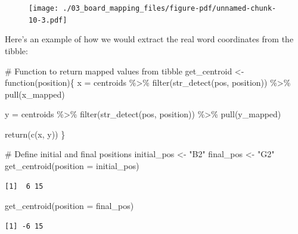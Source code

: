 \documentclass[
  letterpaper,
  DIV=11,
  numbers=noendperiod]{scrreprt}
\newenvironment{Shaded}{\begin{snugshade}}{\end{snugshade}}
\newcommand{\AttributeTok}[1]{\textcolor[rgb]{0.40,0.45,0.13}{#1}}
\newcommand{\CommentTok}[1]{\textcolor[rgb]{0.37,0.37,0.37}{#1}}
\newcommand{\ControlFlowTok}[1]{\textcolor[rgb]{0.00,0.23,0.31}{#1}}
\newcommand{\FunctionTok}[1]{\textcolor[rgb]{0.28,0.35,0.67}{#1}}
\newcommand{\NormalTok}[1]{\textcolor[rgb]{0.00,0.23,0.31}{#1}}
\newcommand{\OtherTok}[1]{\textcolor[rgb]{0.00,0.23,0.31}{#1}}
\newcommand{\SpecialCharTok}[1]{\textcolor[rgb]{0.37,0.37,0.37}{#1}}
\newcommand{\StringTok}[1]{\textcolor[rgb]{0.13,0.47,0.30}{#1}}
\begin{document}
\begin{figure}[H]

{\centering \texttt{[image: ./03\_board\_mapping\_files/figure-pdf/unnamed-chunk-10-3.pdf]}

}

\end{figure}

Here's an example of how we would extract the real word coordinates from
the tibble:

\begin{Shaded}
\begin{Highlighting}[]
\CommentTok{\# Function to return mapped values from tibble}
\NormalTok{get\_centroid }\OtherTok{\textless{}{-}} \ControlFlowTok{function}\NormalTok{(position)\{}
\NormalTok{  x }\OtherTok{=}\NormalTok{ centroids }\SpecialCharTok{\%\textgreater{}\%} 
    \FunctionTok{filter}\NormalTok{(}\FunctionTok{str\_detect}\NormalTok{(pos, position)) }\SpecialCharTok{\%\textgreater{}\%} 
    \FunctionTok{pull}\NormalTok{(x\_mapped)}
  
\NormalTok{  y }\OtherTok{=}\NormalTok{ centroids }\SpecialCharTok{\%\textgreater{}\%} 
    \FunctionTok{filter}\NormalTok{(}\FunctionTok{str\_detect}\NormalTok{(pos, position)) }\SpecialCharTok{\%\textgreater{}\%} 
    \FunctionTok{pull}\NormalTok{(y\_mapped)}
  
  \FunctionTok{return}\NormalTok{(}\FunctionTok{c}\NormalTok{(x, y))}
\NormalTok{\}}

\CommentTok{\# Define initial and final positions}
\NormalTok{initial\_pos }\OtherTok{\textless{}{-}} \StringTok{"B2"}
\NormalTok{final\_pos }\OtherTok{\textless{}{-}} \StringTok{"G2"}
\FunctionTok{get\_centroid}\NormalTok{(}\AttributeTok{position =}\NormalTok{ initial\_pos)}
\end{Highlighting}
\end{Shaded}

\begin{verbatim}
[1]  6 15
\end{verbatim}

\begin{Shaded}
\begin{Highlighting}[]
\FunctionTok{get\_centroid}\NormalTok{(}\AttributeTok{position =}\NormalTok{ final\_pos)}
\end{Highlighting}
\end{Shaded}

\begin{verbatim}
[1] -6 15
\end{verbatim}
\end{document}
